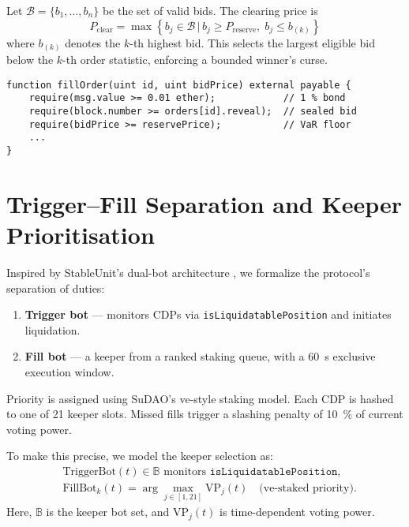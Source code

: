 \documentclass[11pt]{article}
\begin{document}
Let $\mathcal{B} = \{b_1, \dots, b_n\}$ be the set of valid bids. The clearing price is
\[
P_{\text{clear}} = \max\left\{ b_j \in \mathcal{B} \,|\, b_j \geq P_{\text{reserve}},\; b_j \leq b_{(k)} \right\}
\]
where $b_{(k)}$ denotes the $k$-th highest bid. This selects the largest eligible bid below the $k$-th order statistic, enforcing a bounded winner's curse.

\begin{lstlisting}[caption={Solidity pseudo-code: auction guard}]
function fillOrder(uint id, uint bidPrice) external payable {
    require(msg.value >= 0.01 ether);            // 1 % bond
    require(block.number >= orders[id].reveal);  // sealed bid
    require(bidPrice >= reservePrice);           // VaR floor
    ...
}
\end{lstlisting}


\section{Trigger–Fill Separation and Keeper Prioritisation}
\label{sec:bots}
Inspired by StableUnit’s dual-bot architecture \parencite{stableunit2025spec}, we formalize the protocol's separation of duties:

\begin{enumerate}[label=\textbf{\arabic*.},wide, labelindent=0pt]
  \item \textbf{Trigger bot} — monitors CDPs via \texttt{isLiquidatablePosition} and initiates liquidation.
  \item \textbf{Fill bot} — a keeper from a ranked staking queue, with a \SI{60}{\second} exclusive execution window.
\end{enumerate}

Priority is assigned using SuDAO's ve-style staking model.  
Each CDP is hashed to one of 21 keeper slots. Missed fills trigger a slashing penalty of \SI{10}{\percent} of current voting power.

\medskip

To make this precise, we model the keeper selection as:
\begin{align*}
&\text{TriggerBot}(t) \in \mathbb{B} \text{ monitors } \texttt{isLiquidatablePosition}, \\
&\text{FillBot}_k(t) = \arg\max_{j \in[1,21]} \text{VP}_j(t) \quad \text{(ve-staked priority)}.
\end{align*}
Here, $\mathbb{B}$ is the keeper bot set, and \( \text{VP}_j(t) \) is time-dependent voting power.
\end{document}
